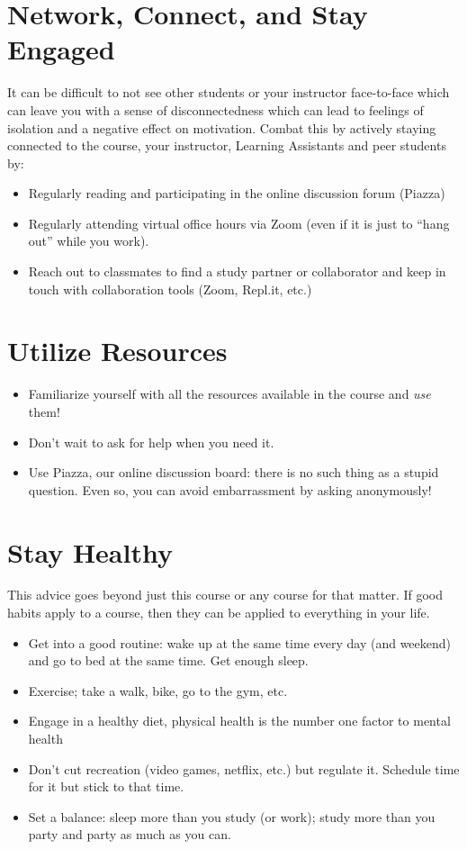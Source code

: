 \documentclass[12pt]{scrartcl}
\begin{document}
\section{Network, Connect, and Stay Engaged}

It can be difficult to not see other students or your instructor face-to-face
which can leave you with a sense of disconnectedness which can lead to feelings
of isolation and a negative effect on motivation.  Combat this by actively 
staying connected to the course, your instructor, Learning Assistants and peer
students by:

\begin{itemize}
  \item Regularly reading and participating in the online discussion forum (Piazza)
  \item Regularly attending virtual office hours via Zoom (even if it is just
  to ``hang out'' while you work).  
  \item Reach out to classmates to find a study partner or collaborator and keep
  in touch with collaboration tools (Zoom, Repl.it, etc.)
\end{itemize}

\section{Utilize Resources}

\begin{itemize}
  \item Familiarize yourself with all the resources available in the course and 
  \emph{use} them!
  \item Don't wait to ask for help when you need it.
  \item Use Piazza, our online discussion board: there is no such thing as a
  stupid question.  Even so, you can avoid embarrassment by asking anonymously!
\end{itemize}


\section{Stay Healthy}

This advice goes beyond just this course or any course for that matter.  If
good habits apply to a course, then they can be applied to everything in your
life.  

\begin{itemize}
  \item Get into a good routine: wake up at the same time every day (and weekend)
  and go to bed at the same time.   Get enough sleep.
  \item Exercise; take a walk, bike, go to the gym, etc.
  \item Engage in a healthy diet, physical health is the number one factor to
  mental health
  \item Don't cut recreation (video games, netflix, etc.) but regulate it.  
  Schedule time for it but stick to that time.  
  \item Set a balance: sleep more than you study (or work); study more than you party
  and party as much as you can.
\end{itemize}
\end{document}
